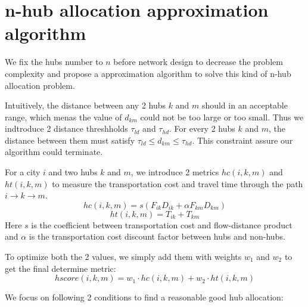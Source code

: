 \documentclass{llncs}
\begin{document}
\section{n-hub allocation approximation algorithm}

We fix the hubs number to $n$ before network design to decrease the problem complexity and propose a approximation algorithm to solve this kind of n-hub allocation problem.

Intuitively, the distance between any 2 hubs $k$ and $m$ should in an acceptable range, which menas the value of $d_{km}$ could not be too large or too small. Thus we indtroduce 2 distance threshholds $\tau_{ld}$ and $\tau_{hd}$. For every 2 hubs $k$ and $m$, the distance between them must satisfy $\tau_{ld} \leq d_{km} \leq \tau_{hd}$. This constraint assure our algorithm could terminate.

For a city $i$ and two hubs $k$ and $m$,  we introduce 2 metrics $hc(i,k,m)$ and $ht(i,k, m)$ to measure the transportation cost and travel time through the path $i \rightarrow k \rightarrow m$. 
\begin{equation}
	hc(i,k,m) = s(F_{ik}D_{ik} + \alpha F_{km}D_{km})
\end{equation}
\begin{equation}
    ht(i,k,m) = T_{ik} + T_{km}
\end{equation}
Here $s$ is the coefficient between transportation cost and flow-distance product and $\alpha$ is the transportation cost discount factor between hubs and non-hubs.


To optimize both the 2 values, we simply add them with weights $w_1$ and $w_2$ to get the final determine metric:
\begin{equation}
hscore(i,k,m) = w_1 \cdot hc(i,k, m) + w_2 \cdot ht(i,k, m)
\end{equation}

We focus on following 2 conditions to find a reasonable good hub allocation:
\end{document}
